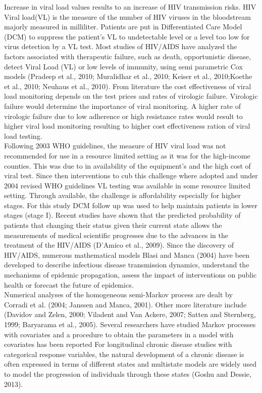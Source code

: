 \documentclass[11pt]{article}
\begin{document}
	Increase in viral load values results to an increase of HIV transmission risks. HIV Viral load(VL) is the measure of the number of HIV viruses in the bloodstream majorly measured in milliliter. Patients are put in Differentiated Care Model (DCM) to suppress the patient's VL to undetectable level or a level too low for virus detection by a VL test. Most studies of HIV/AIDS have analyzed the factors associated with therapeutic failure, such as death, opportunistic disease, detect Viral Load (VL) or low levels of immunity, using semi parametric Cox models (Pradeep et al., 2010; Muralidhar et al., 2010; Keiser et al., 2010;Koethe et al., 2010; Neuhaus et al., 2010). From literature the cost effectiveness of viral load monitoring depends on the test prices and rates of virologic failure. Virologic failure would determine the importance of viral monitoring. A higher rate of virologic failure due to low adherence or high resistance rates would result to higher viral load monitoring resulting to higher cost effectiveness ration of viral load testing. \\
	
	Following 2003 WHO guidelines, the measure of HIV viral load was not recommended for use in a resource limited setting as it was for the high-income counties. This was due to in availability of the equipment's and the high cost of viral test. Since then interventions to cub this challenge where adopted and under 2004 revised WHO guidelines VL testing was available in some resource limited setting. Through available, the challenge is affordability especially for higher stages. For this study DCM follow up was used to help maintain patients in lower stages (stage I). Recent studies have shown that the predicted probability of patients that changing their status given their current state allows the measurements of medical scientific progresses due to the advances in the treatment of the HIV/AIDS (D’Amico et al., 2009). Since the discovery of HIV/AIDS, numerous mathematical models Blasi and Manca (2004) have been developed to describe infectious disease transmission dynamics, understand the mechanisms of epidemic propagation, assess the impact of interventions on public health or forecast the future of epidemics.\\
	
	Numerical analyses of the homogeneous semi-Markov process are dealt by Corradi et al. (2004; Janssen and Manca, 2001). Other more literature include (Davidov and Zelen, 2000; Viladent and Van Ackere, 2007; Satten and Sternberg, 1999; Baryarama et al., 2005). Several researchers have studied Markov processes with covariates and a procedure to obtain the parameters in a model with covariates has been reported For longitudinal chronic disease studies with categorical response variables, the natural development of a chronic disease is often expressed in terms of different states and multistate models are widely used to model the progression of individuals through these states (Goshu and Dessie, 2013).
	\\ 
	
\end{document}
